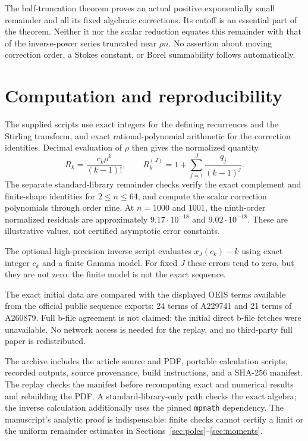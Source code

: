 \documentclass[11pt,letterpaper]{article}
\numberwithin{equation}{section}
\theoremstyle{remark}\newtheorem{remark}[theorem]{Remark}
\begin{document}
The half-truncation theorem proves an actual positive exponentially small remainder and all its fixed algebraic corrections. Its cutoff is an essential part of the theorem. Neither it nor the scalar reduction equates this remainder with that of the inverse-power series truncated near $\rho n$. No assertion about moving correction order, a Stokes constant, or Borel summability follows automatically.

\section{Computation and reproducibility}
\label{sec:computations}
The supplied scripts use exact integers for the defining recurrences and the Stirling transform, and exact rational-polynomial arithmetic for the correction identities. Decimal evaluation of $\rho$ then gives the normalized quantity
\[
 R_k=\frac{c_k\rho^k}{(k-1)!},\qquad
 R_k^{(J)}=1+\sum_{j=1}^{J}\frac{q_j}{(k-1)^j}.
\]
The separate standard-library remainder checks verify the exact complement and finite-shape identities for $2\le n\le64$, and compute the scalar correction polynomials through order nine. At $n=1000$ and $1001$, the ninth-order normalized residuals are approximately $9.17\cdot10^{-18}$ and $9.02\cdot10^{-18}$. These are illustrative values, not certified asymptotic error constants.

The optional high-precision inverse script evaluates $x_J(c_k)-k$ using exact integer $c_k$ and a finite Gamma model. For fixed $J$ these errors tend to zero, but they are not zero: the finite model is not the exact sequence.


The exact initial data are compared with the displayed OEIS terms available from the official public sequence exports: 24 terms of A229741 and 21 terms of A260879. Full b-file agreement is not claimed; the initial direct b-file fetches were unavailable. No network access is needed for the replay, and no third-party full paper is redistributed.

The archive includes the article source and PDF, portable calculation scripts, recorded outputs, source provenance, build instructions, and a SHA-256 manifest. The replay checks the manifest before recomputing exact and numerical results and rebuilding the PDF. A standard-library-only path checks the exact algebra; the inverse calculation additionally uses the pinned \texttt{mpmath} dependency. The manuscript's analytic proof is indispensable: finite checks cannot certify a limit or the uniform remainder estimates in Sections~\ref{sec:poles}--\ref{sec:moments}.
\end{document}
